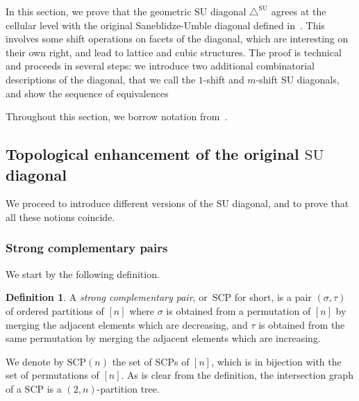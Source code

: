\documentclass{amsart}
\newcommand{\darkblue}{\color{darkblue}} %
\theoremstyle{definition}
\newtheorem{definition}[theorem]{Definition}
\newcommand{\defn}[1]{\textsl{\darkblue #1}} %
\newcommand{\SU}{\mathrm{SU}}
\newcommand{\SUD}{\triangle^{\mathrm{SU}}}
\newcommand{\SCP}{\mathrm{SCP}}
\begin{document}
In this section, we prove that the geometric $\SU$ diagonal $\SUD$ agrees at the cellular level with the original Saneblidze-Umble diagonal defined in~\cite{SaneblidzeUmble}.
This involves some shift operations on facets of the diagonal, which are interesting on their own right, and lead to lattice and cubic structures.
The proof is technical and proceeds in several steps: we introduce two additional combinatorial descriptions of the diagonal, that we call the $1$-shift and $m$-shift $\SU$ diagonals, and show the sequence of equivalences
\begin{center}
\end{center}
Throughout this section, we borrow notation from~\cite{SaneblidzeUmble-comparingDiagonals}.


\subsection{Topological enhancement of the original $\SU$ diagonal}
\label{subsec:topological-SU}

We proceed to introduce different versions of the $\SU$ diagonal, and to prove that all these notions coincide.


\subsubsection{Strong complementary pairs}

We start by the following definition.

\begin{definition}
\label{def:strong-complementary-pairs}
A \defn{strong complementary pair}, or~\defn{$\SCP$} for short, is a pair $(\sigma,\tau)$ of ordered partitions of $[n]$ where $\sigma$ is obtained from a permutation of $[n]$ by merging the adjacent elements which are decreasing, and $\tau$ is obtained from the same permutation by merging the adjacent elements which are increasing.
\end{definition}

We denote by $\SCP(n)$ the set of $\SCP$s of $[n]$, which is in bijection with the set of permutations of $[n]$.
As is clear from the definition, the intersection graph of a $\SCP$ is a $(2,n)$-partition tree.
\end{document}
